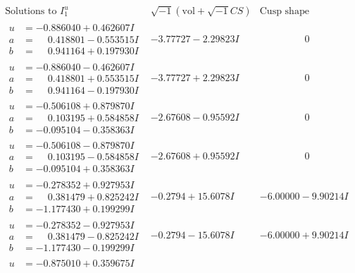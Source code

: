 \documentclass[1p]{elsarticle_modified}
\theoremstyle{definition}
\newcommand{\I}{\sqrt{-1}}
\begin{document}
$$\begin{array}{c|c|c}  
\text{Solutions to }I^u_{1}& \I (\text{vol} + \sqrt{-1}CS) & \text{Cusp shape}\\
 \hline 
\begin{aligned}
u &= -0.886040 + 0.462607 I \\
a &= \phantom{-}0.418801 - 0.553515 I \\
b &= \phantom{-}0.941164 + 0.197930 I\end{aligned}
 & -3.77727 - 2.29823 I & \phantom{-0.000000 } 0 \\ \hline\begin{aligned}
u &= -0.886040 - 0.462607 I \\
a &= \phantom{-}0.418801 + 0.553515 I \\
b &= \phantom{-}0.941164 - 0.197930 I\end{aligned}
 & -3.77727 + 2.29823 I & \phantom{-0.000000 } 0 \\ \hline\begin{aligned}
u &= -0.506108 + 0.879870 I \\
a &= \phantom{-}0.103195 + 0.584858 I \\
b &= -0.095104 - 0.358363 I\end{aligned}
 & -2.67608 - 0.95592 I & \phantom{-0.000000 } 0 \\ \hline\begin{aligned}
u &= -0.506108 - 0.879870 I \\
a &= \phantom{-}0.103195 - 0.584858 I \\
b &= -0.095104 + 0.358363 I\end{aligned}
 & -2.67608 + 0.95592 I & \phantom{-0.000000 } 0 \\ \hline\begin{aligned}
u &= -0.278352 + 0.927953 I \\
a &= \phantom{-}0.381479 + 0.825242 I \\
b &= -1.177430 + 0.199299 I\end{aligned}
 & -0.2794 + 15.6078 I & -6.00000 - 9.90214 I \\ \hline\begin{aligned}
u &= -0.278352 - 0.927953 I \\
a &= \phantom{-}0.381479 - 0.825242 I \\
b &= -1.177430 - 0.199299 I\end{aligned}
 & -0.2794 - 15.6078 I & -6.00000 + 9.90214 I \\ \hline\begin{aligned}
u &= -0.875010 + 0.359675 I \\

\end{aligned}
\end{array}$$
\end{document}
